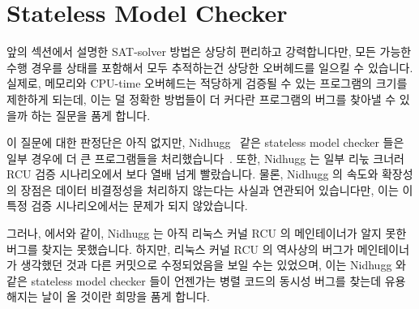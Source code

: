 
\section{Stateless Model Checker}
\label{sec:formal:Stateless Model Checker}

앞의 섹션에서 설명한 SAT-solver 방법은 상당히 편리하고 강력합니다만, 모든
가능한 수행 경우를 상태를 포함해서 모두 추적하는건 상당한 오버헤드를 일으킬 수
있습니다.
실제로, 메모리와 CPU-time 오버헤드는 적당하게 검증될 수 있는 프로그램의 크기를
제한하게 되는데, 이는 덜 정확한 방법들이 더 커다란 프로그램의 버그를 찾아낼 수
있을까 하는 질문을 품게 합니다.

이 질문에 대한 판정단은 아직 없지만, Nidhugg~\cite{CarlLeonardsson2014Nidhugg}
같은 stateless model checker 들은 일부 경우에 더 큰 프로그램들을
처리했습니다~\cite{SMC-TreeRCU}.
또한, Nidhugg 는 일부 리눇 크너러 RCU 검증 시나리오에서  보다 열배
넘게 빨랐습니다.
물론, Nidhugg 의 속도와 확장성의 장점은 데이터 비결정성을 처리하지 않는다는
사실과 연관되어 있습니다만, 이는 이 특정 검증 시나리오에서는 문제가 되지
않았습니다.
\iffalse

The SAT-solver approaches described in the previous section are quite
convenient and powerful, but the full tracking of all possible
executions, including state, can incur substantial overhead.
In fact, the memory and CPU-time overheads can sharply limit the size
of programs that can be feasibly verified, which raises the question
of whether less-exact approaches might find bugs in larger programs.

Although the jury is still out on this question, stateless model
checkers such as Nidhugg~\cite{CarlLeonardsson2014Nidhugg} have in
some cases handled larger programs~\cite{SMC-TreeRCU}.
In addition, Nidhugg was more than an order of magnitude faster than
was \co{cbmc} for some Linux-kernel RCU verification scenarios.
Of course, Nidhugg's speed and scalability advantages are tied to
the fact that it does not handle data non-determinism, but this
was not a factor in these particular verification scenarios.
\fi

그러나,  에서와 같이, Nidhugg 는 아직 리눅스 커널 RCU 의 메인테이너가
알지 못한 버그를 찾지는 못했습니다.
하지만, 리눅스 커널 RCU 의 역사상의 버그가 메인테이너가 생각했던 것과 다른
커밋으로 수정되었음을 보일 수는 있었으며, 이는 Nidhugg 와 같은 stateless model
checker 들이 언젠가는 병렬 코드의 동시성 버그를 찾는데 유용해지는 날이 올
것이란 희망을 품게 합니다.
\iffalse

Nevertheless, as with \co{cbmc}, Nidhugg has not yet been able to
locate a bug that Linux-kernel RCU's maintainer was not already
aware of.
However, it was able to demonstrate that one historical bug in
Linux-kernel RCU was fixed by a different commit than the maintainer
thought, which gives some additional hope that stateless model checkers
like Nidhugg might someday be useful for finding concurrency bugs in
parallel code.
\fi
